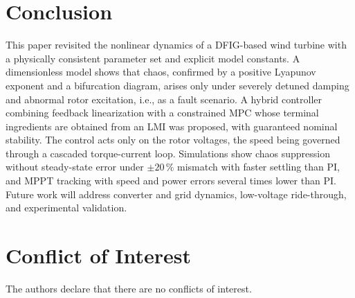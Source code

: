 \documentclass[conference]{IEEEtran}
\begin{document}
\section{Conclusion}

This paper revisited the nonlinear dynamics of a DFIG-based wind turbine with a physically consistent parameter set and explicit model constants. A dimensionless model shows that chaos, confirmed by a positive Lyapunov exponent and a bifurcation diagram, arises only under severely detuned damping and abnormal rotor excitation, i.e., as a fault scenario. A hybrid controller combining feedback linearization with a constrained MPC whose terminal ingredients are obtained from an LMI was proposed, with guaranteed nominal stability. The control acts only on the rotor voltages, the speed being governed through a cascaded torque-current loop. Simulations show chaos suppression without steady-state error under $\pm20\,\%$ mismatch with faster settling than PI, and MPPT tracking with speed and power errors several times lower than PI. Future work will address converter and grid dynamics, low-voltage ride-through, and experimental validation.

\section*{Conflict of Interest}
The authors declare that there are no conflicts of interest.
\end{document}
